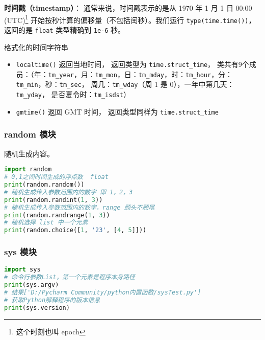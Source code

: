 \textbf{时间戳（timestamp）}： 通常来说，时间戳表示的是从 1970 年 1 月 1 日 00:00 (UTC)\footnote{这个时刻也叫 epoch} 开始按秒计算的偏移量（不包括闰秒）。我们运行 \verb|type(time.time())|， 返回的是 \verb|float| 类型精确到 \verb|1e-6| 秒。

格式化的时间字符串
\begin{itemize}
\item \verb|localtime()| 返回当地时间， 返回类型为 \verb|time.struct_time|， 类共有9个成员：（年：\verb|tm_year|，月：\verb|tm_mon|，日：\verb|tm_mday|，时：\verb|tm_hour|，分：\verb|tm_min|，秒：\verb|tm_sec|， 周几：\verb|tm_wday|（周 1 是 0），一年中第几天：\verb|tm_yday|， 是否夏令时：\verb|tm_isdst|）
\item \verb|gmtime()| 返回 GMT 时间， 返回类型同样为 \verb|time.struct_time|
\end{itemize}

\subsubsection{random 模块}
随机生成内容。
\begin{lstlisting}[language=python]
import random
# 0,1之间时间生成的浮点数  float
print(random.random())
# 随机生成传入参数范围内的数字 即 1，2，3
print(random.randint(1, 3))
# 随机生成传入参数范围内的数字，range 顾头不顾尾
print(random.randrange(1, 3))
# 随机选择 list 中一个元素
print(random.choice([1, '23', [4, 5]]))
\end{lstlisting}

\subsubsection{sys 模块}
\begin{lstlisting}[language=python]
import sys
# 命令行参数List，第一个元素是程序本身路径
print(sys.argv)
# 结果['D:/Pycharm Community/python内置函数/sysTest.py']
# 获取Python解释程序的版本信息
print(sys.version)
\end{lstlisting}

